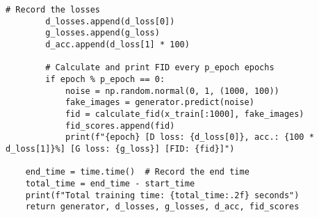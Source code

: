 \begin{lstlisting}[style=mypython, caption=GAN model with dense layers]
        # Record the losses
        d_losses.append(d_loss[0])
        g_losses.append(g_loss)
        d_acc.append(d_loss[1] * 100)
        
        # Calculate and print FID every p_epoch epochs
        if epoch % p_epoch == 0:
            noise = np.random.normal(0, 1, (1000, 100))
            fake_images = generator.predict(noise)
            fid = calculate_fid(x_train[:1000], fake_images)
            fid_scores.append(fid)
            print(f"{epoch} [D loss: {d_loss[0]}, acc.: {100 * d_loss[1]}%] [G loss: {g_loss}] [FID: {fid}]")

    end_time = time.time()  # Record the end time
    total_time = end_time - start_time
    print(f"Total training time: {total_time:.2f} seconds")
    return generator, d_losses, g_losses, d_acc, fid_scores
\end{lstlisting}




